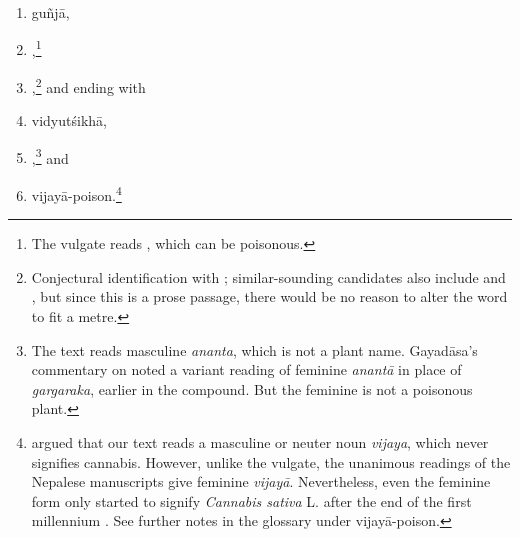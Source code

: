 \begin{translation}
\begin{itemize}
\begin{enumerate}
        \item \gls{guñjā},
        
        \item {},\footnote{The vulgate reads 
      , which can be poisonous.}
        
       \item {},\footnote{Conjectural identification with 
       ; similar-sounding candidates also include 
        and , but since this is a prose passage, 
       there would be no reason to alter the word to fit a metre.} and ending with 
           
\item \gls{vidyutśikhā},

\item {},\footnote{\label{ananta-poison}The
    text reads masculine \emph{ananta}, which is not a plant name. 
    Gayadāsa's commentary on  noted a variant reading of
    feminine \emph{anantā} in place of \emph{gargaraka}, earlier in the
    compound. But the feminine  is not a poisonous plant.}
    and

\item \gls{vijayā-poison}.\footnote{\citet[61, n.\,3]{meul-sear} argued that
    our text reads a masculine or neuter noun \emph{vijaya}, which never
    signifies cannabis. However, unlike the vulgate, the unanimous
    readings of the Nepalese manuscripts give feminine \emph{vijayā}. 
    Nevertheless, even the feminine form only started to signify
    \emph{Cannabis sativa} L. after the end of the first millennium
    \citep{meul-sear,wuja-cann,mchu-2021}.  See further notes in the glossary
    under \gls{vijayā-poison}.}
        \end{enumerate}
        \end{itemize}
    
    
    

\end{translation}
